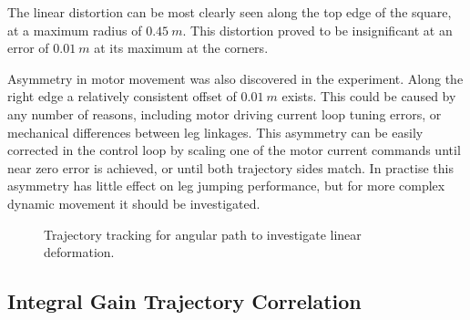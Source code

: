 The linear distortion can be most clearly seen along the top edge of the square, at a maximum radius of $0.45\ m$. This distortion proved to be insignificant at an error of $0.01\ m$ at its maximum at the corners. 

Asymmetry in motor movement was also discovered in the experiment. Along the right edge a relatively consistent offset of $0.01\ m$ exists. This could be caused by any number of reasons, including motor driving current loop tuning errors, or mechanical differences between leg linkages. This asymmetry can be easily corrected in the control loop by scaling  one of the motor current commands until near zero error is achieved, or until both trajectory sides match. In practise this asymmetry has little effect on leg jumping performance, but for more complex dynamic movement it should be investigated.

\begin{figure}
\centering
{}
\caption{Trajectory tracking for angular path to investigate linear deformation.}
\label{fig:Trajectory tracking for angular path}
\end{figure}

\subsection{Integral Gain Trajectory Correlation}

